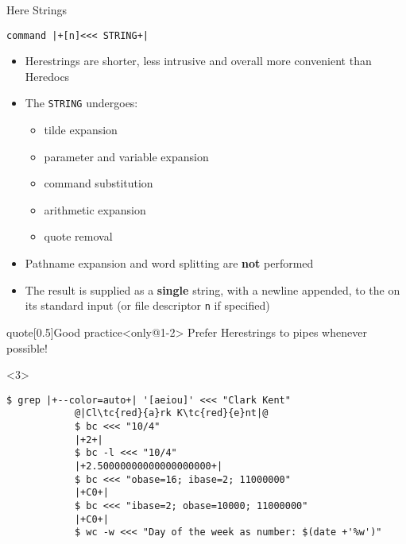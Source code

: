 \begin{frame}[fragile]{Here Strings}
    \vspace{-3mm}
    \begin{lstlisting}[style=MyBash, numbers=none]
        command |+[n]<<< STRING+|
    \end{lstlisting}
    \vspace{2mm}
    \begin{itemize}[<only@1-2>]
        \item Herestrings are shorter, less intrusive and overall more convenient than Heredocs\\[-0.5ex]
        \item The \texttt{STRING} undergoes:
              \begin{itemize}
                  \item tilde expansion
                  \item parameter and variable expansion
                  \item command substitution
                  \item arithmetic expansion
                  \item quote removal
              \end{itemize}
        \item \alert{Pathname expansion} and word splitting \alert{are \textbf{not} performed}
        \item The result is supplied as a \alert{\textbf{single}} string, with a newline appended, to the  on its standard input (or file descriptor \texttt{n} if specified)
    \end{itemize}
    \begin{varblock}{quote}[0.5\textwidth]{Good practice}<only@1-2>
        \textnormal{Prefer Herestrings to pipes whenever possible!}
    \end{varblock}
    \begin{onlyenv}<3>
        \begin{lstlisting}[style=MyBash, style=oddnumbers]
            $ grep |+--color=auto+| '[aeiou]' <<< "Clark Kent"
            @|Cl\tc{red}{a}rk K\tc{red}{e}nt|@
            $ bc <<< "10/4"
            |+2+|
            $ bc -l <<< "10/4"
            |+2.50000000000000000000+|
            $ bc <<< "obase=16; ibase=2; 11000000"
            |+C0+|
            $ bc <<< "ibase=2; obase=10000; 11000000"
            |+C0+|
            $ wc -w <<< "Day of the week as number: $(date +'%w')"

\end{lstlisting}
\end{onlyenv}
\end{frame}
